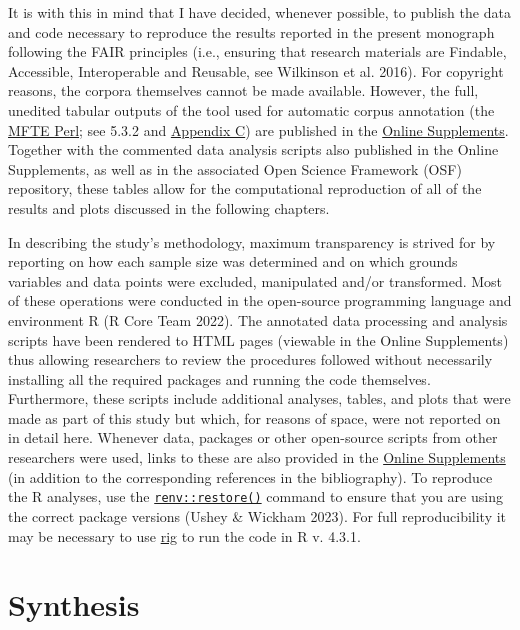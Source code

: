 \documentclass[
  letterpaper,
  DIV=11,
  numbers=noendperiod]{scrreprt}
\begin{document}
It is with this in mind that I have decided, whenever possible, to
publish the data and code necessary to reproduce the results reported in
the present monograph following the FAIR principles (i.e., ensuring that
research materials are Findable, Accessible, Interoperable and Reusable,
see Wilkinson et al. 2016). For copyright reasons, the corpora
themselves cannot be made available. However, the full, unedited tabular
outputs of the tool used for automatic corpus annotation (the
\href{https://github.com/elenlefoll/MultiFeatureTaggerEnglish}{MFTE
Perl}; see 5.3.2 and
\href{https://elenlefoll.github.io/TextbookMDA/AppendixC.html}{Appendix
C}) are published in the
\href{https://elenlefoll.github.io/TextbookMDA}{Online Supplements}.
Together with the commented data analysis scripts also published in the
Online Supplements, as well as in the associated Open Science Framework
(OSF) repository, these tables allow for the computational reproduction
of all of the results and plots discussed in the following chapters.

In describing the study's methodology, maximum transparency is strived
for by reporting on how each sample size was determined and on which
grounds variables and data points were excluded, manipulated and/or
transformed. Most of these operations were conducted in the open-source
programming language and environment R (R Core Team 2022). The annotated
data processing and analysis scripts have been rendered to HTML pages
(viewable in the Online Supplements) thus allowing researchers to review
the procedures followed without necessarily installing all the required
packages and running the code themselves. Furthermore, these scripts
include additional analyses, tables, and plots that were made as part of
this study but which, for reasons of space, were not reported on in
detail here. Whenever data, packages or other open-source scripts from
other researchers were used, links to these are also provided in the
\href{https://elenlefoll.github.io/TextbookMDA/references.html}{Online
Supplements} (in addition to the corresponding references in the
bibliography). To reproduce the R analyses, use the
\href{https://rstudio.github.io/renv/reference/restore.html}{\texttt{renv::restore()}}
command to ensure that you are using the correct package versions (Ushey
\& Wickham 2023). For full reproducibility it may be necessary to use
\href{https://github.com/r-lib/rig}{rig} to run the code in R v. 4.3.1.


\chapter{Synthesis}\label{synthesis}
\end{document}
